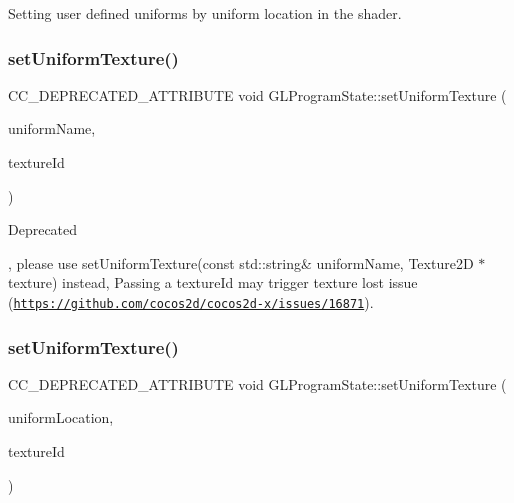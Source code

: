 Setting user defined uniforms by uniform location in the shader. \mbox{\label{classGLProgramState_a222f78e49e5e4531a986a691f81394d1}} 
\subsubsection{\texorpdfstring{set\+Uniform\+Texture()}{setUniformTexture()}\hspace{0.1cm}{\footnotesize\ttfamily [1/2]}}
{\footnotesize\ttfamily C\+C\+\_\+\+D\+E\+P\+R\+E\+C\+A\+T\+E\+D\+\_\+\+A\+T\+T\+R\+I\+B\+U\+TE void G\+L\+Program\+State\+::set\+Uniform\+Texture (\begin{DoxyParamCaption}\item[{const std\+::string \&}]{uniform\+Name,  }\item[{G\+Luint}]{texture\+Id }\end{DoxyParamCaption})}

\begin{DoxyRefDesc}{Deprecated}
\item[\hyperlink{deprecated__deprecated000366}{Deprecated}], please use set\+Uniform\+Texture(const std\+::string\& uniform\+Name, Texture2\+D $\ast$texture) instead, Passing a {\ttfamily texture\+Id} may trigger texture lost issue (\href{https://github.com/cocos2d/cocos2d-x/issues/16871}{\tt https\+://github.\+com/cocos2d/cocos2d-\/x/issues/16871}). \end{DoxyRefDesc}
\mbox{\label{classGLProgramState_a642a29610687e43ce7f9c7af0cfa0495}} 
\subsubsection{\texorpdfstring{set\+Uniform\+Texture()}{setUniformTexture()}\hspace{0.1cm}{\footnotesize\ttfamily [2/2]}}
{\footnotesize\ttfamily C\+C\+\_\+\+D\+E\+P\+R\+E\+C\+A\+T\+E\+D\+\_\+\+A\+T\+T\+R\+I\+B\+U\+TE void G\+L\+Program\+State\+::set\+Uniform\+Texture (\begin{DoxyParamCaption}\item[{G\+Lint}]{uniform\+Location,  }\item[{G\+Luint}]{texture\+Id }\end{DoxyParamCaption})}

